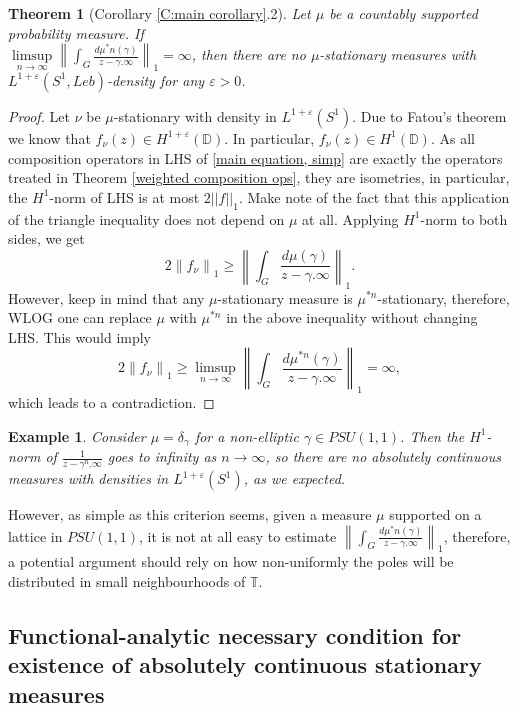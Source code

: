 \documentclass[11pt]{article}
\newtheorem{theorem}{Theorem}[section]
\newtheorem{example}{Example}[section]
\begin{document}
\begin{theorem}[Corollary \ref{C:main corollary}.2]
	Let $\mu$ be a countably supported probability measure. If \\ $\limsup\limits_{n \rightarrow \infty} \left\| \int_G \frac{d \mu^*n(\gamma)}{z - \gamma.\infty} \right\|_1 = \infty$, then there are no $\mu$-stationary measures with $L^{1+\varepsilon}(S^1, Leb)$-density for any $\varepsilon > 0$.
\end{theorem}
\begin{proof}
	Let $\nu$ be $\mu$-stationary with density in $L^{1+\varepsilon}(S^1)$. Due to Fatou's theorem we know that $f_\nu(z) \in H^{1 + \varepsilon}(\mathbb{D})$. In particular, $f_\nu(z) \in H^1(\mathbb{D})$. As all composition operators in LHS of \eqref{main equation, simp} are exactly the operators treated in Theorem \ref{weighted composition ops}, they are isometries, in particular, the $H^1$-norm of LHS is at most $2||f||_1$. Make note of the fact that this application of the triangle inequality does not depend on $\mu$ at all. Applying $H^1$-norm to both sides, we get
	\[
	2 \left\| f_\nu \right\|_1 \ge \left\| \int_G \frac{d \mu(\gamma)}{z - \gamma.\infty} \right\|_1.
	\]
	However, keep in mind that any $\mu$-stationary measure is $\mu^{*n}$-stationary, therefore, WLOG one can replace $\mu$ with $\mu^{*n}$ in the above inequality without changing LHS. This would imply
	\[
	2 \left\| f_\nu \right\|_1 \ge \limsup\limits_{n \rightarrow \infty} \left\| \int_G \frac{d \mu^{*n}(\gamma)}{z - \gamma.\infty} \right\|_1 = \infty,
	\]
	which leads to a contradiction.
\end{proof}

\begin{example}
	Consider $\mu = \delta_\gamma$ for a non-elliptic $\gamma \in PSU(1,1)$. Then the $H^1$-norm of $\frac{1}{z - \gamma^n.\infty}$ goes to infinity as $n \rightarrow \infty$, so there are no absolutely continuous measures with densities in $L^{1 + \varepsilon}(S^1)$, as we expected.
\end{example}

However, as simple as this criterion seems, given a measure $\mu$ supported on a lattice in $PSU(1,1)$, it is not at all easy to estimate $\left\| \int_G \frac{d \mu^*n(\gamma)}{z - \gamma.\infty} \right\|_1$, therefore, a potential argument should rely on how non-uniformly the poles will be distributed in small neighbourhoods of $\mathbb{T}$.

\subsection{Functional-analytic necessary condition for existence of absolutely continuous stationary measures}
\end{document}
